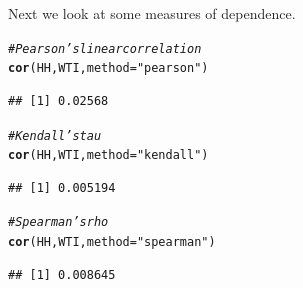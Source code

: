 \documentclass[10pt]{article}\usepackage[]{graphicx}\usepackage[]{color}
\makeatletter
\newcommand{\hlstr}[1]{\textcolor[rgb]{0.192,0.494,0.8}{#1}}%
\newcommand{\hlcom}[1]{\textcolor[rgb]{0.678,0.584,0.686}{\textit{#1}}}%
\newcommand{\hlstd}[1]{\textcolor[rgb]{0.345,0.345,0.345}{#1}}%
\newcommand{\hlkwc}[1]{\textcolor[rgb]{0.333,0.667,0.333}{#1}}%
\newcommand{\hlkwd}[1]{\textcolor[rgb]{0.737,0.353,0.396}{\textbf{#1}}}%
\newenvironment{kframe}{%
 \def\at@end@of@kframe{}%
 \ifinner\ifhmode%
  \def\at@end@of@kframe{\end{minipage}}%
  \begin{minipage}{\columnwidth}%
 \fi\fi%
 \def\FrameCommand##1{\hskip\@totalleftmargin \hskip-\fboxsep
 \colorbox{shadecolor}{##1}\hskip-\fboxsep
     \hskip-\linewidth \hskip-\@totalleftmargin \hskip\columnwidth}%
 \MakeFramed {\advance\hsize-\width
   \@totalleftmargin\z@ \linewidth\hsize
   \@setminipage}}%
 {\par\unskip\endMakeFramed%
 \at@end@of@kframe}
\newenvironment{knitrout}{}{} %
\makeatother
\begin{document}
Next we look at some measures of dependence.
\begin{knitrout}
\color{fgcolor}\begin{kframe}
\begin{alltt}
\hlcom{# Pearson's linear correlation}
\hlkwd{cor}\hlstd{(HH, WTI,} \hlkwc{method} \hlstd{=} \hlstr{"pearson"}\hlstd{)}
\end{alltt}
\begin{verbatim}
## [1] 0.02568
\end{verbatim}
\begin{alltt}
\hlcom{# Kendall's tau}
\hlkwd{cor}\hlstd{(HH, WTI,} \hlkwc{method} \hlstd{=} \hlstr{"kendall"}\hlstd{)}
\end{alltt}
\begin{verbatim}
## [1] 0.005194
\end{verbatim}
\begin{alltt}
\hlcom{# Spearman's rho}
\hlkwd{cor}\hlstd{(HH, WTI,} \hlkwc{method} \hlstd{=} \hlstr{"spearman"}\hlstd{)}
\end{alltt}
\begin{verbatim}
## [1] 0.008645
\end{verbatim}
\end{kframe}
\end{knitrout}
\end{document}
